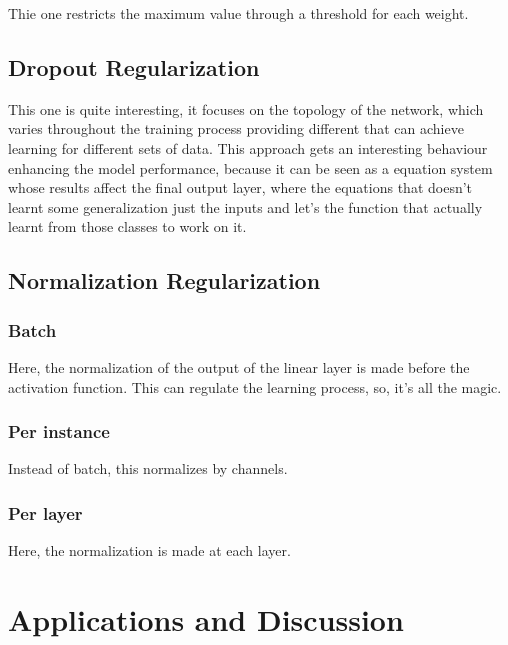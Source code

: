 \documentclass[
]{IEEEtran}
\begin{document}
Thie one restricts the maximum value through a threshold for each
weight.

\subsection{Dropout Regularization}\label{dropout-regularization}

This one is quite interesting, it focuses on the topology of the
network, which varies throughout the training process providing
different  that can achieve learning for different sets
of data. This approach gets an interesting behaviour enhancing the model
performance, because it can be seen as a equation system whose results
affect the final output layer, where the equations that doesn't learnt
some generalization just  the inputs and let's the function
that actually learnt from those classes to work on it.

\subsection{Normalization
Regularization}\label{normalization-regularization}

\subsubsection{Batch}\label{batch}

Here, the normalization of the output of the linear layer is made before
the activation function. This can regulate the learning process, so,
it's all the magic.

\subsubsection{Per instance}\label{per-instance}

Instead of batch, this normalizes by channels.

\subsubsection{Per layer}\label{per-layer}

Here, the normalization is made at each layer.

\section{Applications and Discussion}\label{applications-and-discussion}
\end{document}
